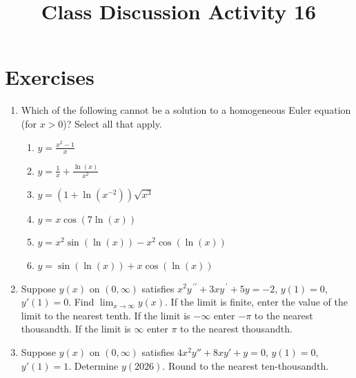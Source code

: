 \documentclass{ximera}
\begin{document}
\begin{abstract}
 \end{abstract}

    \title{Class Discussion Activity 16}
    
    \maketitle

\section*{Exercises}

\begin{enumerate}[label=(\arabic*)]

\item  Which of the following cannot be a solution to a homogeneous Euler equation (for $x>0$)?  Select all that apply.

\begin{enumerate}[label=(\alph*)]
\item $\displaystyle y=\frac{x^2-1}{x}$ 
\item $\displaystyle y=\frac{1}{x}+\frac{\ln(x)}{x^2}$  %
\item $y=(1+\ln(x^{-2}))\sqrt{x^3}$
\item $y=x\cos{\left(7\ln{(x)}\right)}$
\item $y=x^2\sin{\left(\ln{(x)}\right)}-x^2\cos{\left(\ln{(x)}\right)}$
\item $y=\sin{\left(\ln{(x)}\right)}+x\cos{\left(\ln{(x)}\right)}$ %
\end{enumerate}




\item Suppose $y(x)$ on $(0,\infty)$ satisfies $x^2 y^{\,\prime\prime} +3xy^{\,\prime}+5y=-2$, $y(1)=0$, $y'(1)=0$. Find $\displaystyle \lim_{x\rightarrow \infty}y(x)$. If the limit is finite, enter the value of the limit to the nearest tenth. If the limit is $-\infty$ enter $-\pi$ to the nearest thousandth. If the limit is $\infty$ enter $\pi$ to the nearest thousandth.




\item Suppose $y(x)$ on $(0,\infty)$ satisfies $4x^2 y''+8xy'+y=0$, $y(1)=0$, $y'(1)=1$. Determine $y(2026)$.  Round to the nearest ten-thousandth.


\end{enumerate}
\end{document}
